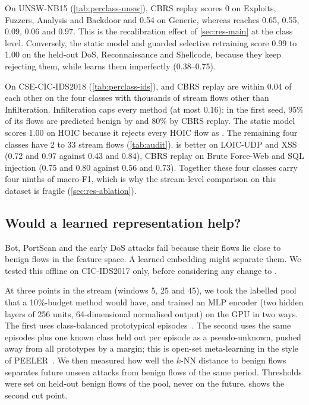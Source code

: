 On UNSW-NB15 (\cref{tab:perclass-unsw}), CBRS replay scores 0 on Exploits, Fuzzers, Analysis and Backdoor
and 0.54 on Generic, whereas \nova{} reaches 0.65, 0.55, 0.09, 0.06 and 0.97. This is the recalibration effect of
\cref{sec:res-main} at the class level. Conversely, the static model and guarded selective retraining score 0.99
to 1.00 on the held-out DoS, Reconnaissance and Shellcode, because they keep rejecting them, while \nova{} learns
them imperfectly (0.38--0.75).

On CSE-CIC-IDS2018 (\cref{tab:perclass-ids}), \nova{} and CBRS replay are within 0.04 of each other on the four
classes with thousands of stream flows other than Infilteration. Infilteration caps every method (at most 0.16):
in the first seed, 95\% of its flows are predicted benign by \nova{} and 80\% by CBRS replay. The static model
scores 1.00 on HOIC because it rejects every HOIC flow as \unk{}. The remaining four classes have 2 to 33 stream
flows (\cref{tab:audit}). \nova{} is better on LOIC-UDP and XSS (0.72 and 0.97 against 0.43 and 0.84), CBRS replay
on Brute Force-Web and SQL injection (0.75 and 0.80 against 0.56 and 0.73). Together these four classes carry four
ninths of macro-F1, which is why the stream-level comparison on this dataset is fragile
(\cref{sec:res-ablation}).

\subsection{Would a learned representation help?}
\label{sec:res-meta}
Bot, PortScan and the early DoS attacks fail because their flows lie close to benign flows in the feature space.
A learned embedding might separate them. We tested this offline on CIC-IDS2017 only, before considering any change
to \nova{}.

At three points in the stream (windows 5, 25 and 45), we took the labelled pool that a 10\%-budget method would
have, and trained an MLP encoder (two hidden layers of 256 units, 64-dimensional normalised output) on the GPU in
two ways. The first uses class-balanced prototypical episodes~\cite{snell2017prototypical}. The second uses the same
episodes plus one known class held out per episode as a pseudo-unknown, pushed away from all prototypes by a
margin; this is open-set meta-learning in the style of PEELER~\cite{liu2020peeler}. We then measured how well the
$k$-NN distance to benign flows separates future unseen attacks from benign flows of the same period. Thresholds
were set on held-out benign flows of the pool, never on the future.  shows the second cut point.

